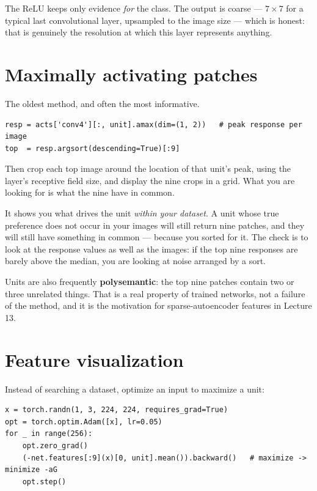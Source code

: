 \documentclass[11pt]{article}
\begin{document}
The ReLU keeps only evidence \emph{for} the class. The output is coarse ---
$7\times7$ for a typical last convolutional layer, upsampled to the image size ---
which is honest: that is genuinely the resolution at which this layer
represents anything.

\section{Maximally activating patches}

The oldest method, and often the most informative.

\begin{lstlisting}
resp = acts['conv4'][:, unit].amax(dim=(1, 2))   # peak response per image
top  = resp.argsort(descending=True)[:9]
\end{lstlisting}

Then crop each top image around the location of that unit's peak, using the
layer's receptive field size, and display the nine crops in a grid. What you are
looking for is what the nine have in common.

\begin{keybox}
 It shows you what drives the unit
\emph{within your dataset}. A unit whose true preference does not occur in your
images will still return nine patches, and they will still have something in
common --- because you sorted for it. The check is to look at the response
values as well as the images: if the top nine responses are barely above the
median, you are looking at noise arranged by a sort.
\end{keybox}

Units are also frequently \textbf{polysemantic}: the top nine patches contain two
or three unrelated things. That is a real property of trained networks, not a
failure of the method, and it is the motivation for sparse-autoencoder features
in Lecture 13.

\section{Feature visualization}

Instead of searching a dataset, optimize an input to maximize a unit:

\begin{lstlisting}
x = torch.randn(1, 3, 224, 224, requires_grad=True)
opt = torch.optim.Adam([x], lr=0.05)
for _ in range(256):
    opt.zero_grad()
    (-net.features[:9](x)[0, unit].mean()).backward()   # maximize -> minimize -aG
    opt.step()
\end{lstlisting}
\end{document}
